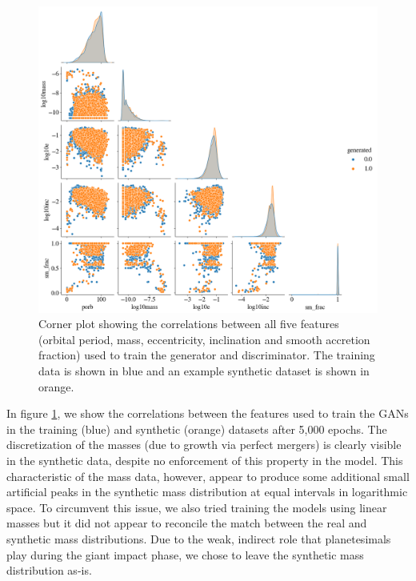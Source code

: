 \begin{figure}
\begin{center}
    \includegraphics[width=\textwidth]{figures/stip/real_syn_corner.png}
    \caption{Corner plot showing the correlations between all five features (orbital period, mass, eccentricity, inclination and smooth accretion fraction) used to train the generator and discriminator. The training data is shown in blue and an example synthetic dataset is shown in orange.\label{fig:real_syn_corner}}
\end{center}
\end{figure}

In figure \ref{fig:real_syn_corner}, we show the correlations between the features used to train the GANs in the training (blue) and synthetic (orange) datasets after 5,000 epochs. The discretization of the masses (due to growth via perfect mergers) is clearly visible in the synthetic data, despite no enforcement of this property in the model. This characteristic of the mass data, however, appear to produce some additional small artificial peaks in the synthetic mass distribution at equal intervals in logarithmic space. To circumvent this issue, we also tried training the models using linear masses but it did not appear to reconcile the match between the real and synthetic mass distributions. Due to the weak, indirect role that planetesimals play during the giant impact phase, we chose to leave the synthetic mass distribution as-is.

